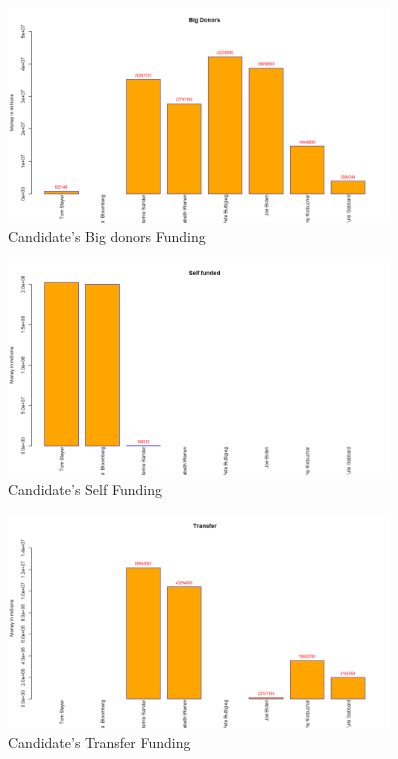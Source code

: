 \begin{figure}[H]
    \centering
    \includegraphics[width=0.9\textwidth]{figures/Bigdonor.png}
    \caption{Candidate's Big donors Funding}
    \label{Bigdonor}
\end{figure}

\begin{figure}[H]
    \centering
    \includegraphics[width=0.9\textwidth]{figures/Selffunnded.png}
    \caption{Candidate's Self Funding}
    \label{Selffunnded}
\end{figure}

\begin{figure}[H]
    \centering
    \includegraphics[width=0.9\textwidth]{figures/Transfer.png}
    \caption{Candidate's Transfer Funding}
    \label{Transfer}
\end{figure}

